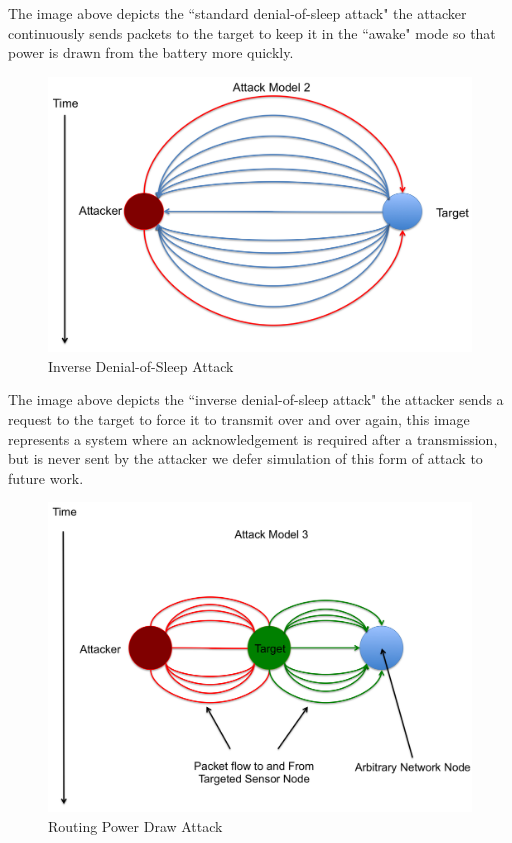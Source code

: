 The image above depicts the ``standard denial-of-sleep attack" the attacker continuously sends packets to the target to keep it in the ``awake" mode so that power is drawn from the battery more quickly.

\begin{figure}[H]
\caption{Inverse Denial-of-Sleep Attack}
\includegraphics[width = \linewidth]{Figures/AModel2.png}
\end{figure}

The image above depicts the ``inverse denial-of-sleep attack" the attacker sends a request to the target to force it to transmit over and over again, this image represents a system where an acknowledgement is required after a transmission, but is never sent by the attacker we defer simulation of this form of attack to future work.

\begin{figure}[H]
\caption{Routing Power Draw Attack}
\includegraphics[width = \linewidth]{Figures/AModel3.png}
\end{figure}

